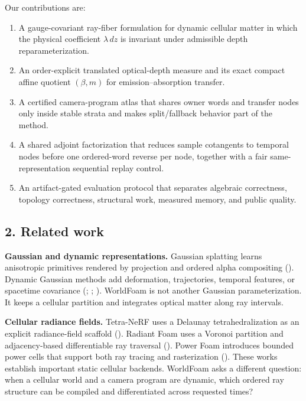 \documentclass[
]{article}
\providecommand{\tightlist}{%
  \setlength{\itemsep}{0pt}\setlength{\parskip}{0pt}}
\begin{document}
Our contributions are:

\begin{enumerate}
\def\labelenumi{\arabic{enumi}.}
\tightlist
\item
  A gauge-covariant ray-fiber formulation for dynamic cellular matter in
  which the physical coefficient \(\lambda\,dz\) is invariant under
  admissible depth reparameterization.
\item
  An order-explicit translated optical-depth measure and its exact
  compact affine quotient \((\beta,m)\) for emission--absorption
  transfer.
\item
  A certified camera-program atlas that shares owner words and transfer
  nodes only inside stable strata and makes split/fallback behavior part
  of the method.
\item
  A shared adjoint factorization that reduces sample cotangents to
  temporal nodes before one ordered-word reverse per node, together with
  a fair same-representation sequential replay control.
\item
  An artifact-gated evaluation protocol that separates algebraic
  correctness, topology correctness, structural work, measured memory,
  and public quality.
\end{enumerate}

\subsection{2. Related work}\label{related-work}

\textbf{Gaussian and dynamic representations.} Gaussian splatting learns
anisotropic primitives rendered by projection and ordered alpha
compositing (). Dynamic
Gaussian methods add deformation, trajectories, temporal features, or
spacetime covariance (;
;
). WorldFoam is not
another Gaussian parameterization. It keeps a cellular partition and
integrates optical matter along ray intervals.

\textbf{Cellular radiance fields.} Tetra-NeRF uses a Delaunay
tetrahedralization as an explicit radiance-field scaffold
().
Radiant Foam uses a Voronoi partition and adjacency-based differentiable
ray traversal (). Power Foam introduces bounded power cells that support
both ray tracing and rasterization
().
These works establish important static cellular backends. WorldFoam asks
a different question: when a cellular world and a camera program are
dynamic, which ordered ray structure can be compiled and differentiated
across requested times?
\end{document}
